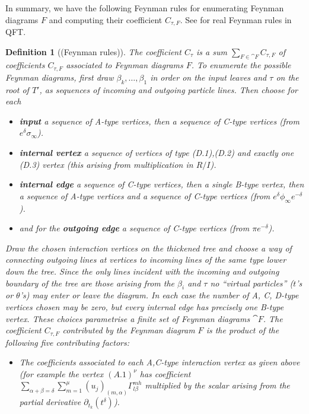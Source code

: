 \documentclass[english,letter paper,12pt,leqno]{article}
\theoremstyle{example}
\newtheorem{definition}[theorem]{Definition}
\numberwithin{equation}{section}
\begin{document}
In summary, we have the following Feynman rules for enumerating Feynman diagrams $F$ and computing their coefficient $C_{\tau, F}$. See \cite[\S 6.1]{weinberg} for real Feynman rules in QFT.

\begin{definition}[(Feynman rules)]\label{defn:feynman_rules} The coefficient $C_\tau$ is a sum $\sum_{F \in \cat{F}} C_{\tau, F}$ of coefficients $C_{\tau, F}$ associated to Feynman diagrams $F$. To enumerate the possible Feynman diagrams, first draw $\beta_k,\ldots,\beta_1$ in order on the input leaves and $\tau$ on the root of $T'$, as sequences of incoming and outgoing particle lines. Then choose for each
\begin{itemize}
\item \textbf{input} a sequence of A-type vertices, then a sequence of C-type vertices (from $e^{\delta} \sigma_\infty$). %
\item \textbf{internal vertex} a sequence of vertices of type (D.1),(D.2) and exactly one (D.3) vertex (this arising from multiplication in $R/I$).
\item \textbf{internal edge} a sequence of C-type vertices, then a single B-type vertex, then a sequence of A-type vertices and a sequence of C-type vertices (from $e^{\delta} \phi_\infty e^{-\delta}$).
\item and for the \textbf{outgoing edge} a sequence of C-type vertices (from $\pi e^{-\delta}$).
\end{itemize}
Draw the chosen interaction vertices on the thickened tree and choose a way of connecting outgoing lines at vertices to incoming lines of the same type lower down the tree. Since the only lines incident with the incoming and outgoing boundary of the tree are those arising from the $\beta_i$ and $\tau$ no ``virtual particles'' ($t$'s or $\theta$'s) may enter or leave the diagram. In each case the number of A, C, D-type vertices chosen may be zero, but every internal edge has precisely one B-type vertex. These choices parametrise a finite set of Feynman diagrams $\cat{F}$. The coefficient $C_{\tau, F}$ contributed by the Feynman diagram $F$ is the product of the following five contributing factors:
\begin{itemize}
\item[(i)] The coefficients associated to each A,C-type interaction vertex as given above (for example the vertex $(A.1)^{\nu}$ has coefficient $\sum_{\alpha + \beta = \delta } \sum_{m=1}^\mu (u_j)_{(m,\alpha)} \Gamma^{m h}_{l \beta}$ multiplied by the scalar arising from the partial derivative $\partial_{t_k}(t^\delta)$).

\end{itemize}
\end{definition}
\end{document}
